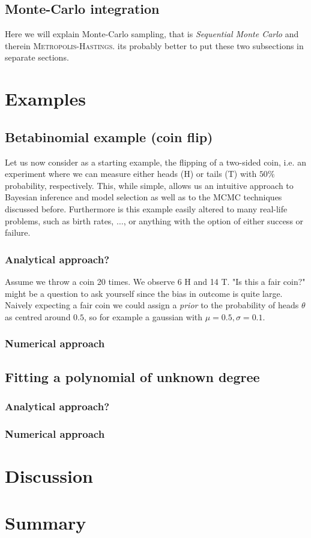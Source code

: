 \documentclass[%
 reprint,
 amsmath,amssymb,
 aps,
]{revtex4-1}
\begin{document}
\subsection{Monte-Carlo integration}
Here we will explain Monte-Carlo sampling, that is \emph{Sequential Monte Carlo} and therein \textsc{Metropolis-Hastings}. its probably better to put these two subsections in separate sections.

\section{Examples}

\subsection{Betabinomial example (coin flip)}
Let us now consider as a starting example, the flipping of a two-sided coin, i.e. an experiment where we can measure either heads (H) or tails (T) with $50\%$ probability, respectively. This, while simple, allows us an intuitive approach to Bayesian inference and model selection as well as to the MCMC techniques discussed before. Furthermore is this example easily altered to many real-life problems, such as birth rates, $\dots$, or anything with the option of either success or failure.
\subsubsection{Analytical approach?}
Assume we throw a coin 20 times. We observe 6 H and 14 T. "Is this a fair coin?" might be a question to ask yourself since the bias in outcome is quite large. Naively expecting a fair coin we could assign a \emph{prior} to the probability of heads $\theta$ as centred around $0.5$, so for example a gaussian with $\mu=0.5,\sigma=0.1$.  
\subsubsection{Numerical approach}


\subsection{Fitting a polynomial of unknown degree}
\subsubsection{Analytical approach?}
\subsubsection{Numerical approach}

\section{Discussion}

\section{Summary}



\end{document}
